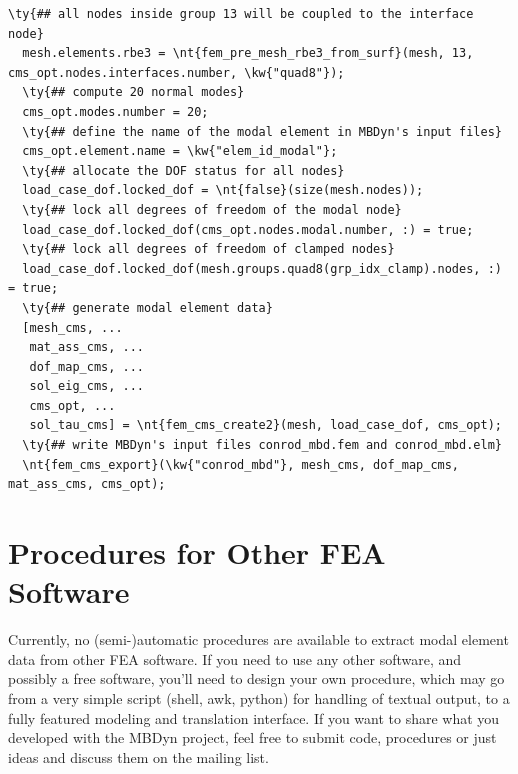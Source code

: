 \begin{Verbatim}[commandchars=\\\{\}]
  \ty{## all nodes inside group 13 will be coupled to the interface node}
  mesh.elements.rbe3 = \nt{fem_pre_mesh_rbe3_from_surf}(mesh, 13, cms_opt.nodes.interfaces.number, \kw{"quad8"});
  \ty{## compute 20 normal modes}
  cms_opt.modes.number = 20;
  \ty{## define the name of the modal element in MBDyn's input files}
  cms_opt.element.name = \kw{"elem_id_modal"};
  \ty{## allocate the DOF status for all nodes}
  load_case_dof.locked_dof = \nt{false}(size(mesh.nodes));
  \ty{## lock all degrees of freedom of the modal node}
  load_case_dof.locked_dof(cms_opt.nodes.modal.number, :) = true;
  \ty{## lock all degrees of freedom of clamped nodes}
  load_case_dof.locked_dof(mesh.groups.quad8(grp_idx_clamp).nodes, :) = true;
  \ty{## generate modal element data}
  [mesh_cms, ...
   mat_ass_cms, ...
   dof_map_cms, ...
   sol_eig_cms, ...
   cms_opt, ...
   sol_tau_cms] = \nt{fem_cms_create2}(mesh, load_case_dof, cms_opt);
  \ty{## write MBDyn's input files conrod_mbd.fem and conrod_mbd.elm}
  \nt{fem_cms_export}(\kw{"conrod_mbd"}, mesh_cms, dof_map_cms, mat_ass_cms, cms_opt); 
\end{Verbatim}

\section{Procedures for Other FEA Software}
Currently, no (semi-)automatic procedures are available to extract modal
element data from other FEA software.
If you need to use any other software, and possibly a free software,
you'll need to design your own procedure, which may go from a very simple
script (shell, awk, python) for handling of textual output, to a fully
featured modeling and translation interface.
If you want to share what you developed with the MBDyn project, feel free
to submit code, procedures or just ideas and discuss them on the
mailing list.

